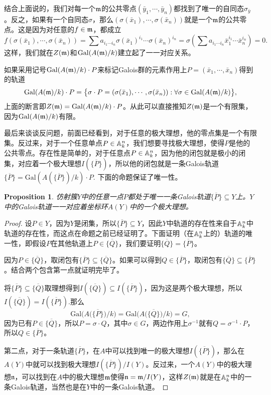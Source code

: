 \documentclass[9pt]{extbook}
\theoremstyle{plain}%
\newtheorem{pro}[defi]{Proposition}%
\begin{document}
结合上面说的，我们对每一个$\mathfrak{m}$的公共零点$(\bar{y}_1,\cdots,\bar{y}_n)$都找到了唯一的自同态$\sigma_{\bar{y}}$。反之，如果有一个自同态$\sigma$，那么$(\sigma(\bar{x}_1),\cdots,\sigma(\bar{x}_n))$就是一个$\mathfrak{m}$的公共零点。这是因为对任意的$f\in\mathfrak{m}$，都成立
\[
	f(\sigma(\bar{x}_1),\cdots,\sigma(\bar{x}_n))=\sum a_{i_1\cdots i_n} \sigma({\bar{x}}_1)^{i_1}\cdots \sigma({\bar{x}}_n)^{i_n}=\sigma\left(\sum a_{i_1\cdots i_n} \bar{x}_1^{i_1}\cdots \bar{x}_n^{i_n}\right)=0.
\]
这样，我们就在$Z(\mathfrak{m})$和$\mathrm{Gal}(A(\mathfrak{m})/k)$建立起了一一对应关系。

如果采用记号$\mathrm{Gal}(A(\mathfrak{m})/k)\cdot P$来标记Galois群的元素作用上$P=(\bar{x}_1,\cdots,\bar{x}_n)$得到的轨道
\[
	\mathrm{Gal}(A(\mathfrak{m})/k)\cdot P=\bigl\{\sigma\cdot P=(\sigma(\bar{x}_1),\cdots,\sigma(\bar{x}_n)):\forall \sigma\in \mathrm{Gal}(A(\mathfrak{m})/k)\bigr\},
\]
上面的断言即$Z(\mathfrak{m})=\mathrm{Gal}(A(\mathfrak{m})/k)\cdot P$。从此可以直接推知$Z(\mathfrak{m})$是一个有限集，因为$\mathrm{Gal}(A(\mathfrak{m})/k)$有限。

最后来谈谈反问题，前面已经看到，对于任意的极大理想，他的零点集是一个有限集。反过来，对于一个任意单点$P\in \mathbb{A}^n_k$，我们想要寻找极大理想，使得$P$是他的公共零点。存在性是简单的，对于任意点$P\in \mathbb{A}^n_k$，因为他的闭包就是极小的闭集，对应着一个极大理想$I(\overline{\{P\}})$，所以他的闭包就是一条Galois轨道$\overline{\{P\}}=\mathrm{Gal}(A(\overline{\{P\}})/k)\cdot P$. 下面的命题保证了唯一性。
\begin{pro}
仿射簇$Y$中的任意一点$P$都处于唯一一条Galois轨道$\overline{\{P\}}\subseteq Y$上。$Y$中的Galois轨道一一对应着坐标环$A(Y)$中的一个极大理想。
\end{pro}
\begin{proof}
设$P\in Y$，因为$Y$是闭集，所以$\overline{\{P\}}\subseteq Y$，因此$Y$中轨道的存在性来自于$\mathbb{A}^n_k$中轨道的存在性，而这点在命题之前已经证明了。下面证明（在$\mathbb{A}^n_k$上的）轨道的唯一性，即假设$P$在其他轨道上$P\in \overline{\{Q\}}$，我们要证明$\overline{\{Q\}}=\overline{\{P\}}$。

因为$P\in \overline{\{Q\}}$，取闭包有$\overline{\{P\}}\subseteq \overline{\{Q\}}$。如果可以得到$Q\in \overline{\{P\}}$，取闭包有$\overline{\{Q\}}\subseteq \overline{\{P\}}$。结合两个包含第一点就证明完毕了。

将$\overline{\{P\}}\subseteq \overline{\{Q\}}$取理想得到$I(\overline{\{Q\}})\subseteq I(\overline{\{P\}})$，因为这是两个极大理想，所以$I(\overline{\{Q\}})=I(\overline{\{P\}})$.那么
\[
	\mathrm{Gal}\bigl(A\bigl(\overline{\{P\}}\bigr)/k\bigr)=\mathrm{Gal}\bigl(A\bigl(\overline{\{Q\}}\bigr)/k\bigr)=G,
\]
因为已有$P\in \overline{\{Q\}}$，所以$P=\sigma \cdot Q$，其中$\sigma\in G$，两边作用上$\sigma^{-1}$就有$Q=\sigma^{-1}\cdot P$，所以$Q\in \overline{\{P\}}$。

第二点，对于一条轨道$\overline{\{P\}}$，在$A$中可以找到唯一的极大理想$I(\overline{\{P\}})$，那么在$A(Y)$中就可以找到极大理想$I(\overline{\{P\}})/I(Y)$。反过来，一个$A(Y)$中的极大理想$\mathfrak{n}$，可以找到在$A$中的极大理想$\mathfrak{m}$使得$\mathfrak{n}=\mathfrak{m}/I(Y)$，这样$Z(\mathfrak{m})$就是在$\mathbb{A}^n_k$中的一条Galois轨道，当然也是在$Y$中的一条Galois轨道。
\end{proof}
\end{document}
